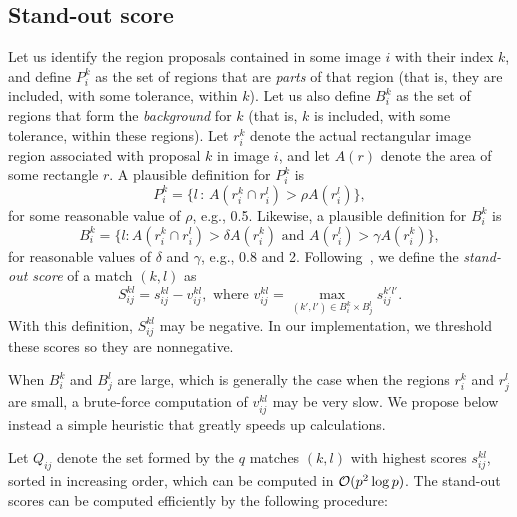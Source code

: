 \documentclass[10pt,twocolumn,letterpaper]{article}
\numberwithin{theorem}{section}
\begin{document}
\subsection{Stand-out score}
Let us identify the region proposals contained in some image $i$ with
their index $k$, and define $P_i^k$ as the set of regions that are
{\em parts} of that region (that is, they are included, with some
tolerance, within $k$). Let us also define $B_i^k$ as the set of
regions that form the {\em background} for $k$ (that is, $k$ is
included, with some tolerance, within these regions). 
Let $r_i^k$ denote the actual rectangular image region associated with
proposal $k$ in image $i$, and let $A(r)$ denote the area of some
rectangle $r$. A plausible definition for $P_i^k$ is
\begin{equation}
P_i^k=\{l\,:\,A(r_i^k\cap r_i^l)> \rho A(r_i^l) \},
\end{equation}
for some reasonable value of $\rho$, e.g., 0.5.
Likewise, a plausible definition for $B_i^k$ is
\begin{equation}
B_i^k =\{l: A(r_i^k\cap r_i^l)> \delta A(r_i^k) \,\,\text{and}
\,\, A(r_i^l)> \gamma A(r_i^k)\},
\end{equation}
for reasonable values of $\delta$ and $\gamma$, e.g., 0.8 and 2.
Following~\cite{CKSP15}, we define the {\em stand-out score} of a match
$(k,l)$ as
\begin{equation}
\label{eq:standout_score}
S_{ij}^{kl}=s_{ij}^{kl}-v_{ij}^{kl},\,\,\text{where}\,\,
v_{ij}^{kl}=\max_{(k',l')\in B_i^k\times B_j^l}
s_{ij}^{k'l'}.
\end{equation}
With this definition, $S_{ij}^{kl}$ may be negative. In our implementation,
we threshold 
these scores so they are nonnegative.

When $B_i^k$ and $B_j^l$ are large, which is generally the case when
the regions $r_i^k$ and $r_j^l$ are small, a brute-force computation
of $v_{ij}^{kl}$ may be very slow. We propose below instead a simple
heuristic that greatly speeds up calculations.

Let $Q_{ij}$ denote the set formed by the $q$ matches $(k,l)$ with
highest scores $s_{ij}^{kl}$, sorted in increasing order, which can be
computed in ${\cal O}(p^2\log p)$.  The stand-out scores can be
computed efficiently by the following procedure:
\\
\end{document}
